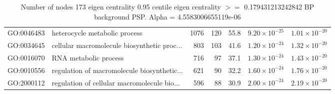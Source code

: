 \begin{table}[ht]
\begin{tabular}{llrrrrr}
  GO:0046483 & heterocycle metabolic process & 1076 & 120 & 55.8 & $9.20 \times 10^{-25}$ & $1.01 \times 10^{-20}$ \\ 
  GO:0034645 & cellular macromolecule biosynthetic proc... & 803 & 103 & 41.6 & $1.20 \times 10^{-24}$ & $1.32 \times 10^{-20}$ \\ 
  GO:0016070 & RNA metabolic process & 716 & 97 & 37.1 & $1.30 \times 10^{-24}$ & $1.43 \times 10^{-20}$ \\ 
  GO:0010556 & regulation of macromolecule biosynthetic... & 621 & 90 & 32.2 & $1.60 \times 10^{-24}$ & $1.76 \times 10^{-20}$ \\ 
  GO:2000112 & regulation of cellular macromolecule bio... & 596 & 88 & 30.9 & $2.00 \times 10^{-24}$ & $2.19 \times 10^{-20}$ \\ 
   \hline
\end{tabular}
\caption{Number of nodes 173 eigen centrality 0.95 centile  eigen centrality $>=$ 0.179431213242842 BP background PSP. Alpha = 4.5583006655119e-06} 
\label{tab:Number of nodes 173 eigen centrality 0.95 centile  eigen centrality $>=$ 0.179431213242842 BP background PSP. Alpha = 4.5583006655119e-06}
\end{table}

